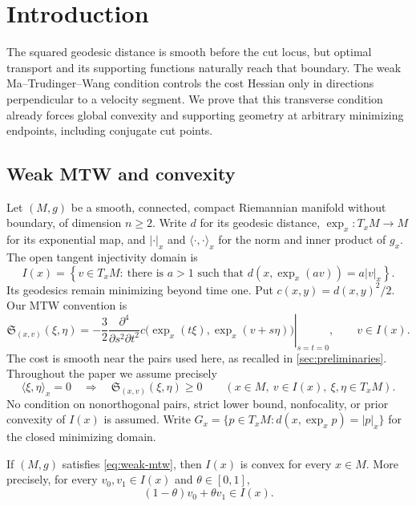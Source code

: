 \section{Introduction}
\label{sec:introduction}

The squared geodesic distance is smooth before the cut locus, but optimal
transport and its supporting functions naturally reach that boundary.
The weak Ma--Trudinger--Wang condition controls the cost Hessian only in
directions perpendicular to a velocity segment. We prove that this
transverse condition already forces global convexity and supporting geometry
at arbitrary minimizing endpoints, including conjugate cut points.

\subsection{Weak MTW and convexity}

Let $(M,g)$ be a smooth, connected, compact Riemannian manifold without
boundary, of dimension $n\geq2$. Write $d$ for its geodesic distance,
$\exp_x:T_xM\to M$ for its exponential map, and $|\cdot|_x$ and
$\langle\cdot,\cdot\rangle_x$ for the norm and inner product of $g_x$.
The open tangent injectivity domain is
\begin{equation}
 I(x)=\left\{v\in T_xM:\ \text{there is }a>1\text{ such that }
 d(x,\exp_x(av))=a|v|_x\right\}.
 \label{eq:injectivity-domain}
\end{equation}
Its geodesics remain minimizing beyond time one. Put $c(x,y)=d(x,y)^2/2$.
Our MTW convention is
\begin{equation}
 \mathfrak S_{(x,v)}(\xi,\eta)
 =-\frac32\left.
 \frac{\partial^4}{\partial s^2\partial t^2}
 c\bigl(\exp_x(t\xi),\exp_x(v+s\eta)\bigr)
 \right|_{s=t=0},\qquad v\in I(x).
 \label{eq:mtw-definition}
\end{equation}
The cost is smooth near the pairs used here, as recalled in
\cref{sec:preliminaries}. Throughout the paper we assume precisely
\begin{equation}
 \langle\xi,\eta\rangle_x=0
 \quad\Longrightarrow\quad
 \mathfrak S_{(x,v)}(\xi,\eta)\geq0
 \qquad(x\in M,\ v\in I(x),\ \xi,\eta\in T_xM).
 \label{eq:weak-mtw}
\end{equation}
No condition on nonorthogonal pairs, strict lower bound, nonfocality,
or prior convexity of $I(x)$ is assumed.
Write $G_x=\{p\in T_xM:d(x,\exp_xp)=|p|_x\}$ for the closed
minimizing domain.

\begin{theorem}\label{thm:main}
If $(M,g)$ satisfies \eqref{eq:weak-mtw}, then $I(x)$ is convex for
every $x\in M$. More precisely, for every $v_0,v_1\in I(x)$ and
$\theta\in[0,1]$,
\[
 (1-\theta)v_0+\theta v_1\in I(x).
\]
\end{theorem}

